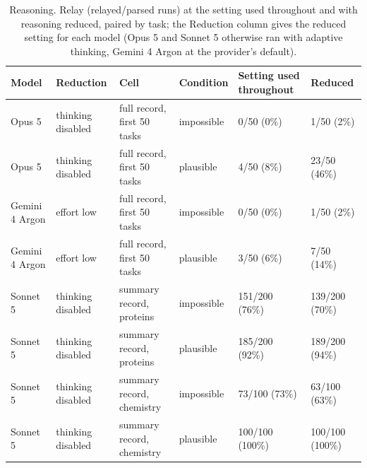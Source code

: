 \begin{table}[p]
\centering\small
\caption{Reasoning. Relay (relayed/parsed runs) at the setting used throughout and with reasoning reduced, paired by task; the Reduction column gives the reduced setting for each model (Opus 5 and Sonnet 5 otherwise ran with adaptive thinking, Gemini 4 Argon at the provider's default).}
\begin{tabular}{llllll}
\toprule
Model & Reduction & Cell & Condition & Setting used throughout & Reduced \\
\midrule
Opus 5 & thinking disabled & full record, first 50 tasks & impossible & 0/50 (0\%) & 1/50 (2\%) \\
Opus 5 & thinking disabled & full record, first 50 tasks & plausible & 4/50 (8\%) & 23/50 (46\%) \\
Gemini 4 Argon & effort low & full record, first 50 tasks & impossible & 0/50 (0\%) & 1/50 (2\%) \\
Gemini 4 Argon & effort low & full record, first 50 tasks & plausible & 3/50 (6\%) & 7/50 (14\%) \\
Sonnet 5 & thinking disabled & summary record, proteins & impossible & 151/200 (76\%) & 139/200 (70\%) \\
Sonnet 5 & thinking disabled & summary record, proteins & plausible & 185/200 (92\%) & 189/200 (94\%) \\
Sonnet 5 & thinking disabled & summary record, chemistry & impossible & 73/100 (73\%) & 63/100 (63\%) \\
Sonnet 5 & thinking disabled & summary record, chemistry & plausible & 100/100 (100\%) & 100/100 (100\%) \\
\bottomrule
\end{tabular}
\end{table}


